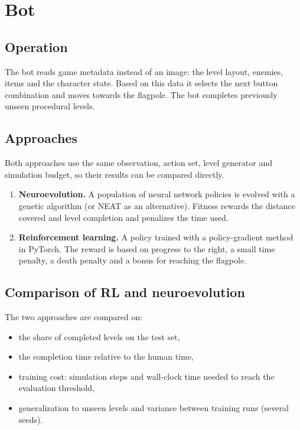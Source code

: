\documentclass[11pt,a4paper]{article}
\begin{document}
\section{Bot}

\subsection{Operation}

The bot reads game metadata instead of an image: the level layout, enemies, items and the
character state. Based on this data it selects the next button combination and moves towards
the flagpole. The bot completes previously unseen procedural levels.

\subsection{Approaches}

Both approaches use the same observation, action set, level generator and simulation budget,
so their results can be compared directly.

\begin{enumerate}
  \item \textbf{Neuroevolution.} A population of neural network policies is evolved with a
        genetic algorithm (or NEAT as an alternative). Fitness rewards the distance covered
        and level completion and penalizes the time used.
  \item \textbf{Reinforcement learning.} A policy trained with a policy-gradient method
        in PyTorch. The reward is based on progress to the right, a small time penalty, a
        death penalty and a bonus for reaching the flagpole.
\end{enumerate}

\subsection{Comparison of RL and neuroevolution}

The two approaches are compared on:
\begin{itemize}
  \item the share of completed levels on the test set,
  \item the completion time relative to the human time,
  \item training cost: simulation steps and wall-clock time needed to reach the
        evaluation threshold,
  \item generalization to unseen levels and variance between training runs (several seeds).
\end{itemize}
\end{document}
